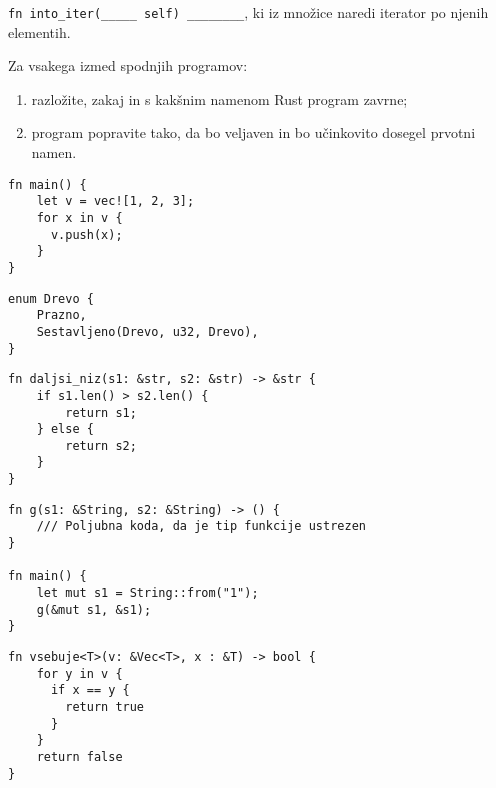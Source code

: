 \documentclass[arhiv]{../izpit}
\begin{document}
\podnaloga
\texttt{fn into_iter(_____ self) ________}, ki iz množice naredi iterator po njenih elementih.



\naloga[\tocke{30}]

Za vsakega izmed spodnjih programov:
\begin{enumerate}
  \item razložite, zakaj in s kakšnim namenom Rust program zavrne;
  \item program popravite tako, da bo veljaven in bo učinkovito dosegel prvotni namen.
\end{enumerate}

\podnaloga
\begin{verbatim}
fn main() {
    let v = vec![1, 2, 3];
    for x in v {
      v.push(x);
    }
}
\end{verbatim}

\podnaloga
\begin{verbatim}
enum Drevo {
    Prazno,
    Sestavljeno(Drevo, u32, Drevo),
}
\end{verbatim}

\podnaloga
\begin{verbatim}
fn daljsi_niz(s1: &str, s2: &str) -> &str {
    if s1.len() > s2.len() {
        return s1;
    } else {
        return s2;
    }
}
\end{verbatim}

\podnaloga

\begin{verbatim}
fn g(s1: &String, s2: &String) -> () {
    /// Poljubna koda, da je tip funkcije ustrezen
}

fn main() {
    let mut s1 = String::from("1");
    g(&mut s1, &s1);
}
\end{verbatim}

\podnaloga

\begin{verbatim}
fn vsebuje<T>(v: &Vec<T>, x : &T) -> bool {
    for y in v {
      if x == y {
        return true
      }
    }
    return false
}
\end{verbatim}
\end{document}
